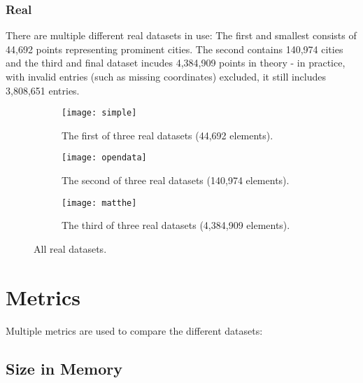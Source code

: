 \subsubsection{Real}

There are multiple different real datasets in use: The first\cite{simplemaps} and smallest consists of 44,692 points representing prominent cities. The second\cite{opendata} contains 140,974 cities and the third\cite{matthe} and final dataset incudes 4,384,909 points in theory - in practice, with invalid entries (such as missing coordinates) excluded, it still includes 3,808,651 entries.

\begin{figure}[H]
    \centering
    \begin{subfigure}{0.458\textwidth}
        \texttt{[image: simple]}
        \caption[The first of three real datasets (44,692 elements).]{The first of three real datasets (44,692 elements).}
        \label{fig:readsimple}
    \end{subfigure}
    \hfill
    \begin{subfigure}{0.458\textwidth}
        \texttt{[image: opendata]}
        \caption[The second of three real datasets (140,974 elements).]{The second of three real datasets (140,974 elements).}
        \label{fig:realopen}
    \end{subfigure}
    \hfill
    \begin{subfigure}{0.458\textwidth}
        \texttt{[image: matthe]}
        \caption[The third of three real datasets (4,384,909 elements).]{The third of three real datasets (4,384,909 elements).}
        \label{fig:realmatthe}
    \end{subfigure}
    \caption[All real datasets.]{All real datasets.}
    \label{fig:real}
\end{figure}

\section{Metrics}

Multiple metrics are used to compare the different datasets:

\subsection{Size in Memory}

